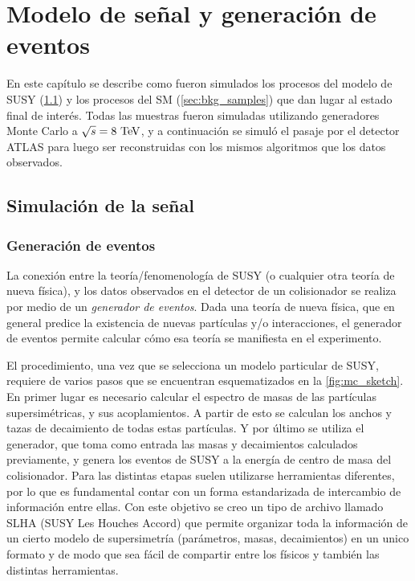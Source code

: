 \chapter{Modelo de señal y generación de eventos}\label{cap:simulaciones}

En este capítulo se describe como fueron simulados los procesos del modelo de
SUSY (\cref{sec:sig_samples}) y los procesos del SM (\cref{sec:bkg_samples}) que
dan lugar al estado final de interés. Todas las muestras fueron simuladas
utilizando generadores Monte Carlo a $\sqrt{s}=8\tev$, y a continuación se simuló
el pasaje por el detector ATLAS para luego ser reconstruidas con los mismos
algoritmos que los datos observados.



\section{Simulación de la se\~nal}\label{sec:sig_samples}

\subsection{Generación de eventos}

La conexión entre la teoría/fenomenología de SUSY (o cualquier otra teoría de
nueva física), y los datos observados en el detector de un
colisionador se realiza por medio de un \emph{generador de eventos}. Dada una
teoría de nueva física, que en general predice la existencia de nuevas
partículas y/o interacciones, el generador de eventos permite calcular cómo esa
teoría se manifiesta en el experimento\cite{Baer:2009tk}.

El procedimiento, una vez que se selecciona un modelo particular de SUSY,
requiere de varios pasos que se encuentran esquematizados en la
\cref{fig:mc_sketch}. En primer lugar es necesario calcular el espectro de masas
de las partículas supersimétricas, y sus acoplamientos. A partir de esto se
calculan los anchos y tazas de decaimiento de todas estas partículas. Y por
último se utiliza el generador, que toma como entrada las masas y decaimientos
calculados previamente, y genera los eventos de SUSY a la energía de centro de
masa del colisionador. Para las distintas etapas suelen utilizarse herramientas
diferentes, por lo que es fundamental contar con un forma estandarizada de
intercambio de información entre ellas. Con este objetivo se creo un tipo de
archivo llamado SLHA (SUSY Les Houches Accord)\cite{SLHA} que permite organizar
toda la información de un cierto modelo de supersimetría (parámetros, masas,
decaimientos) en un unico formato y de modo que sea fácil de compartir entre los
físicos y también las distintas herramientas.

